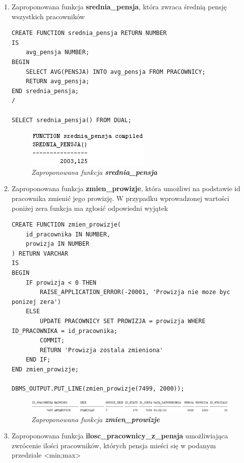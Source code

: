 \documentclass{article}
\begin{document}
\begin{enumerate}
\item Zaproponowana funkcja \textbf{srednia\_pensja}, która zwraca średnią pensję wszystkich pracowników
	
\begin{lstlisting}[style=SQL, caption=\textit{Zaproponowana funckja \textbf{srednia\_pensja}}]
CREATE FUNCTION srednia_pensja RETURN NUMBER
IS
	avg_pensja NUMBER;
BEGIN
	SELECT AVG(PENSJA) INTO avg_pensja FROM PRACOWNICY;
	RETURN avg_pensja;
END srednia_pensja;
/

SELECT srednia_pensja() FROM DUAL;
\end{lstlisting}

		\begin{figure}[H]
			\centering
			\includegraphics[scale=1.2]{zadanie5.png}
			\caption{\textit{Zaproponowana funkcja \textbf{srednia\_pensja}}}
		\end{figure}

\item Zaproponowana funkcja \textbf{zmien\_prowizje}, która umożliwi na podstawie id pracownika zmienić jego prowizję. W przypadku wprowadzonej wartości poniżej zera funkcja ma zgłosić odpowiedni wyjątek

\begin{lstlisting}[style=SQL, caption=\textit{Zaproponowana funkcja \textbf{zmien\_prowizje}}]
CREATE FUNCTION zmien_prowizje(
	id_pracownika IN NUMBER,
	prowizja IN NUMBER
) RETURN VARCHAR
IS
BEGIN
	IF prowizja < 0 THEN
		RAISE_APPLICATION_ERROR(-20001, 'Prowizja nie moze byc ponizej zera')
	ELSE
		UPDATE PRACOWNICY SET PROWIZJA = prowizja WHERE ID_PRACOWNIKA = id_pracownika;
		COMMIT;
		RETURN 'Prowizja zostala zmieniona'
	END IF;
END zmien_prowizje;

DBMS_OUTPUT.PUT_LINE(zmien_prowizje(7499, 2000));
\end{lstlisting}

	\begin{figure}[H]
		\centering
		\includegraphics{zadanie6.png}
		\caption{\textit{Zaproponowana funkcja \textbf{zmien\_prowizje}}}
	\end{figure}

\item Zaproponowana funkcja \textbf{ilosc\_pracownicy\_z\_pensja} umożliwiająca zwrócenie ilości pracowników, których pensja mieści się w podanym przedziale <min;max>


\end{enumerate}
\end{document}
